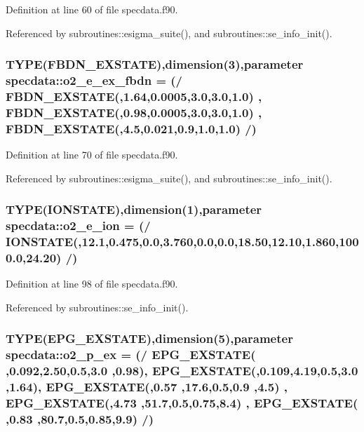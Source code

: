 Definition at line 60 of file specdata.f90.

Referenced by subroutines::esigma\_\-suite(), and subroutines::se\_\-info\_\-init().\hypertarget{namespacespecdata_af2d6b8fc566715d79d76b79cc900229e}{
\subsubsection[{o2\_\-e\_\-ex\_\-fbdn}]{\setlength{\rightskip}{0pt plus 5cm}TYPE(FBDN\_\-EXSTATE),dimension(3),parameter {\bf specdata::o2\_\-e\_\-ex\_\-fbdn} = (/ FBDN\_\-EXSTATE(,1.64,0.0005,3.0,3.0,1.0) , FBDN\_\-EXSTATE(,0.98,0.0005,3.0,3.0,1.0) , FBDN\_\-EXSTATE(,4.5,0.021,0.9,1.0,1.0) /)}}
\label{namespacespecdata_af2d6b8fc566715d79d76b79cc900229e}


Definition at line 70 of file specdata.f90.

Referenced by subroutines::esigma\_\-suite(), and subroutines::se\_\-info\_\-init().\hypertarget{namespacespecdata_a7040a4bcf92d1e17f6158536ca8d5b0a}{
\subsubsection[{o2\_\-e\_\-ion}]{\setlength{\rightskip}{0pt plus 5cm}TYPE(IONSTATE),dimension(1),parameter {\bf specdata::o2\_\-e\_\-ion} = (/ IONSTATE(,12.1,0.475,0.0,3.760,0.0,0.0,18.50,12.10,1.860,1000.0,24.20) /)}}
\label{namespacespecdata_a7040a4bcf92d1e17f6158536ca8d5b0a}


Definition at line 98 of file specdata.f90.

Referenced by subroutines::se\_\-info\_\-init().\hypertarget{namespacespecdata_ae681c0bc4ab2fa5470a5956b4bec78d0}{
\subsubsection[{o2\_\-p\_\-ex}]{\setlength{\rightskip}{0pt plus 5cm}TYPE(EPG\_\-EXSTATE),dimension(5),parameter {\bf specdata::o2\_\-p\_\-ex} = (/ EPG\_\-EXSTATE( ,0.092,2.50,0.5,3.0 ,0.98), EPG\_\-EXSTATE(,0.109,4.19,0.5,3.0 ,1.64), EPG\_\-EXSTATE(,0.57 ,17.6,0.5,0.9 ,4.5) , EPG\_\-EXSTATE(,4.73 ,51.7,0.5,0.75,8.4) , EPG\_\-EXSTATE( ,0.83 ,80.7,0.5,0.85,9.9) /)}}
\label{namespacespecdata_ae681c0bc4ab2fa5470a5956b4bec78d0}


